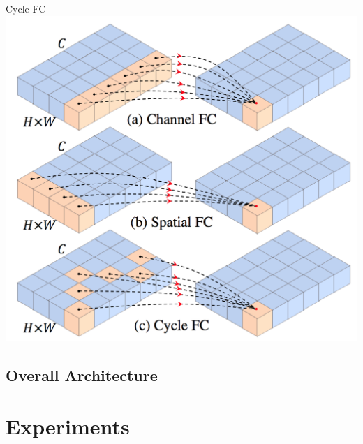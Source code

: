\documentclass{beamer}
\begin{document}
\begin{frame}{Cycle FC}
    \centering
    \includegraphics[height=.8\textheight]{figures/teaser.png}
\end{frame}

\subsection{Overall Architecture}

\section{Experiments}
\end{document}
